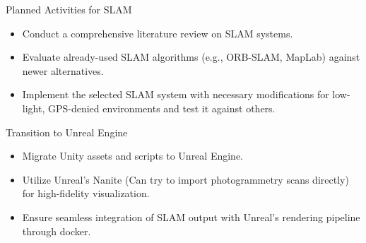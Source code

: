 \begin{frame}{Planned Activities for SLAM}
  \begin{itemize}
    \item Conduct a comprehensive literature review on SLAM systems.
    \item Evaluate already-used SLAM algorithms (e.g., ORB-SLAM, MapLab) against newer alternatives.
    \item Implement the selected SLAM system with necessary modifications for low-light, GPS-denied environments and test it against others.
  \end{itemize}
\end{frame}

\begin{frame}{Transition to Unreal Engine}
  \begin{itemize}
    \item Migrate Unity assets and scripts to Unreal Engine.
    \item Utilize Unreal’s Nanite (Can try to import photogrammetry scans directly) for high-fidelity visualization.
    \item Ensure seamless integration of SLAM output with Unreal’s rendering pipeline through docker.
  \end{itemize}
\end{frame}
